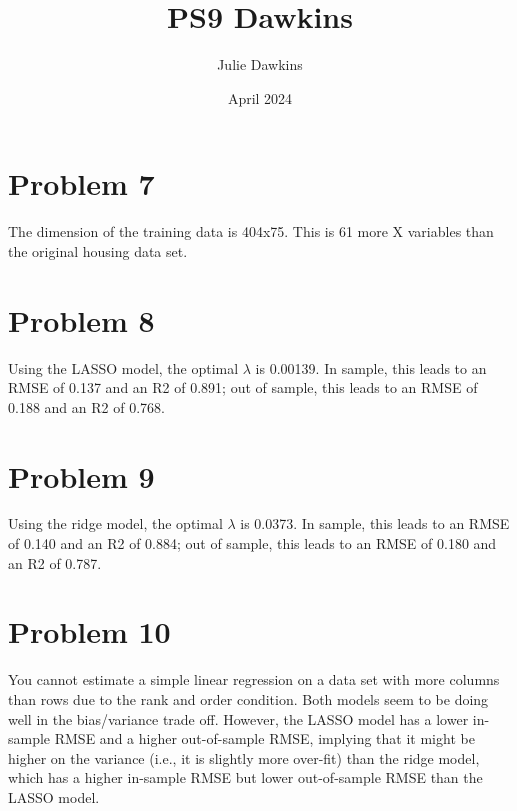 \documentclass[12pt]{article}
\title{PS9 Dawkins}
\author{Julie Dawkins}
\date{April 2024}
\begin{document}
\maketitle

\section{Problem 7}

The dimension of the training data is 404x75. This is 61 more X variables than the original housing data set. 

\section{Problem 8}

Using the LASSO model, the optimal $\lambda$ is 0.00139. In sample, this leads to an RMSE of 0.137 and an R2 of 0.891; out of sample, this leads to an RMSE of 0.188 and an R2 of 0.768. 

\section{Problem 9}

Using the ridge model, the optimal $\lambda$ is 0.0373. In sample, this leads to an RMSE of 0.140 and an R2 of 0.884; out of sample, this leads to an RMSE of 0.180 and an R2 of 0.787.

\section{Problem 10}

You cannot estimate a simple linear regression on a data set with more columns than rows due to the rank and order condition. Both models seem to be doing well in the bias/variance trade off. However, the LASSO model has a lower in-sample RMSE and a higher out-of-sample RMSE, implying that it might be higher on the variance (i.e., it is slightly more over-fit) than the ridge model, which has a higher in-sample RMSE but lower out-of-sample RMSE than the LASSO model. 
\end{document}
